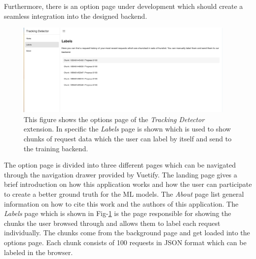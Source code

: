 Furthermore, there is an option page under development which should create a seamless integration into the designed backend.
\begin{figure}
  \begin{center}
    \includegraphics[width=0.95\textwidth]{images/LabelsPage.png}
  \end{center}
  \caption{This figure shows the options page of the \emph{Tracking Detector} extension. In specific the \emph{Labels} page is shown which 
  is used to show chunks of request data which the user can label by itself and send to the training backend.}
  \label{fig:LabelsPage}
\end{figure}
The option page is divided into three different pages which can be navigated through the navigation drawer provided by Vuetify. The landing 
page gives a brief introduction on how this application works and how the user can participate to create a better ground truth for the ML models.
The \emph{About} page list general information on how to cite this work and the authors of this application. The \emph{Labels} page which is 
shown in Fig-\ref{fig:LabelsPage} is the page responsible for showing the chunks the user browsed through and allows them to label each request
individually. The chunks come from the background page and get loaded into the options page. Each chunk consists of 100 requests in JSON format 
which can be labeled in the browser. 
